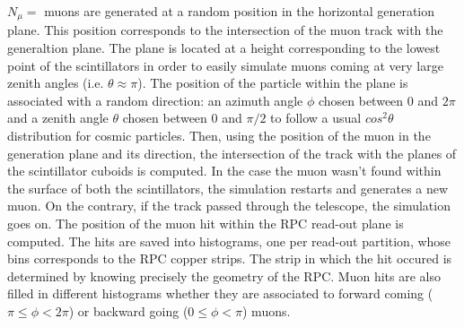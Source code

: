 	$N_{\mu}=$  muons are generated at a random position in the horizontal generation plane. This position corresponds to the intersection of the muon track with the generaltion plane. The plane is located at a height corresponding to the lowest point of the scintillators in order to easily simulate muons coming at very large zenith angles (i.e. $\theta\approx\pi$). The position of the particle within the plane is associated with a random direction: an azimuth angle $\phi$ chosen between 0 and $2\pi$ and a zenith angle $\theta$ chosen between 0 and $\pi/2$ to follow a usual $cos^2\theta$ distribution for cosmic particles. Then, using the position of the muon in the generation plane and its direction, the intersection of the track with the planes of the scintillator cuboids is computed. In the case the muon wasn't found within the surface of both the scintillators, the simulation restarts and generates a new muon. On the contrary, if the track passed through the telescope, the simulation goes on. The position of the muon hit within the RPC read-out plane is computed. The hits are saved into histograms, one per read-out partition, whose bins corresponds to the RPC copper strips. The strip in which the hit occured is determined by knowing precisely the geometry of the RPC. Muon hits are also filled in different histograms whether they are associated to forward coming ($\pi\leq\phi<2\pi$) or backward going ($0\leq\phi<\pi$) muons.

